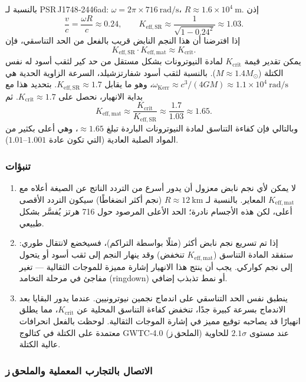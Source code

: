 \documentclass[12pt,a4paper]{article}
\begin{document}
	بالنسبة لـ PSR J1748‑2446ad: \(\omega = 2\pi\times716\ \text{rad/s}\)، \(R\approx 1.6\times10^4\ \text{m}\). إذن
	\[
	\frac{v}{c} = \frac{\omega R}{c} \approx 0.24,\qquad
	K_{\mathrm{eff,SR}} \approx \frac{1}{\sqrt{1-0.24^2}} \approx 1.03.
	\]
	إذا افترضنا أن هذا النجم النابض قريب بالفعل من الحد التناسقي، فإن
	\[
	K_{\mathrm{eff,SR}} \cdot K_{\mathrm{eff,mat}} \approx K_{\mathrm{crit}}.
	\]
	يمكن تقدير قيمة \(K_{\mathrm{crit}}\) لمادة النيوترونات بشكل مستقل من حد كير لثقب أسود له نفس الكتلة (\(M\approx1.4M_\odot\)). بالنسبة لثقب أسود شفارتزشيلد، السرعة الزاوية الحدية هي \(\omega_{\text{Kerr}} \approx c^3/(4GM) \approx 1.1\times10^4\ \text{rad/s}\)، وهو ما يقابل \(K_{\mathrm{eff,SR}} \approx 1.7\). بتحديد هذا مع بداية الانهيار، نحصل على \(K_{\mathrm{crit}} \approx 1.7\). ثم
	\[
	K_{\mathrm{eff,mat}} \approx \frac{K_{\mathrm{crit}}}{K_{\mathrm{eff,SR}}} \approx \frac{1.7}{1.03} \approx 1.65.
	\]
	وبالتالي فإن كفاءة التناسق لمادة النيوترونات الباردة تبلغ \(\approx 1.65\)، وهي أعلى بكثير من المواد الصلبة العادية (التي تكون عادة \(1.001\)–\(1.01\)).
	
	\subsubsection{تنبؤات}
	
	\begin{enumerate}
		\item لا يمكن لأي نجم نابض معزول أن يدور أسرع من التردد الناتج عن الصيغة أعلاه مع \(K_{\mathrm{eff,mat}}\) المعاير. بالنسبة لـ \(R\approx 12\ \text{km}\) (نجم أكثر انضغاطًا) سيكون التردد الأقصى أعلى، لكن هذه الأجسام نادرة؛ الحد الأعلى المرصود حول 716 هرتز يُفسَّر بشكل طبيعي.
		\item إذا تم تسريع نجم نابض أكثر (مثلًا بواسطة التراكم)، فسيخضع لانتقال طوري: ستفقد المادة التناسق (\(K_{\mathrm{eff,mat}}\) تنخفض) وقد ينهار النجم إلى ثقب أسود أو يتحول إلى نجم كواركي. يجب أن ينتج هذا الانهيار إشارة مميزة للموجات الثقالية — تغير مفاجئ في مرحلة التخامد (ringdown) أو نمط تذبذب إضافي.
		\item ينطبق نفس الحد التناسقي على اندماج نجمين نيوترونيين. عندما يدور البقايا بعد الاندماج بسرعة كبيرة جدًا، تنخفض كفاءة التناسق المحلية عن \(K_{\mathrm{crit}}\)، مما يطلق انهيارًا قد يصاحبه توقيع مميز في إشارة الموجات الثقالية. لوحظت بالفعل انحرافات معتمدة على الكتلة في كتالوج GWTC‑4.0 (الملحق ز) عند مستوى \(2.1\sigma\) للحاوية عالية الكتلة.
	\end{enumerate}
	
	\subsubsection{الاتصال بالتجارب المعملية والملحق ز}
	
\end{document}
